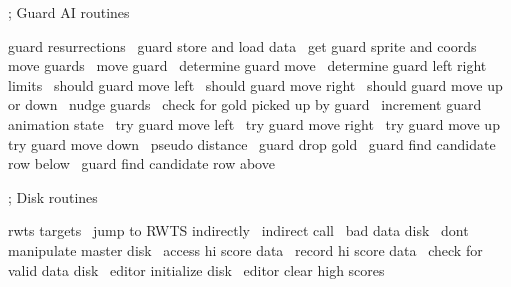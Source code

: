 \documentclass[10pt]{report}%
\begin{document}
    ; Guard AI routines

    \LA{}guard resurrections~{\nwtagstyle{}}\RA{}
    \LA{}guard store and load data~{\nwtagstyle{}}\RA{}
    \LA{}get guard sprite and coords~{\nwtagstyle{}}\RA{}
    \LA{}move guards~{\nwtagstyle{}}\RA{}
    \LA{}move guard~{\nwtagstyle{}}\RA{}
    \LA{}determine guard move~{\nwtagstyle{}}\RA{}
    \LA{}determine guard left right limits~{\nwtagstyle{}}\RA{}
    \LA{}should guard move left~{\nwtagstyle{}}\RA{}
    \LA{}should guard move right~{\nwtagstyle{}}\RA{}
    \LA{}should guard move up or down~{\nwtagstyle{}}\RA{}
    \LA{}nudge guards~{\nwtagstyle{}}\RA{}
    \LA{}check for gold picked up by guard~{\nwtagstyle{}}\RA{}
    \LA{}increment guard animation state~{\nwtagstyle{}}\RA{}
    \LA{}try guard move left~{\nwtagstyle{}}\RA{}
    \LA{}try guard move right~{\nwtagstyle{}}\RA{}
    \LA{}try guard move up~{\nwtagstyle{}}\RA{}
    \LA{}try guard move down~{\nwtagstyle{}}\RA{}
    \LA{}pseudo distance~{\nwtagstyle{}}\RA{}
    \LA{}guard drop gold~{\nwtagstyle{}}\RA{}
    \LA{}guard find candidate row below~{\nwtagstyle{}}\RA{}
    \LA{}guard find candidate row above~{\nwtagstyle{}}\RA{}

    ; Disk routines

    \LA{}rwts targets~{\nwtagstyle{}}\RA{}
    \LA{}jump to RWTS indirectly~{\nwtagstyle{}}\RA{}
    \LA{}indirect call~{\nwtagstyle{}}\RA{}
    \LA{}bad data disk~{\nwtagstyle{}}\RA{}
    \LA{}dont manipulate master disk~{\nwtagstyle{}}\RA{}
    \LA{}access hi score data~{\nwtagstyle{}}\RA{}
    \LA{}record hi score data~{\nwtagstyle{}}\RA{}
    \LA{}check for valid data disk~{\nwtagstyle{}}\RA{}
    \LA{}editor initialize disk~{\nwtagstyle{}}\RA{}
    \LA{}editor clear high scores~{\nwtagstyle{}}\RA{}
\end{document}
